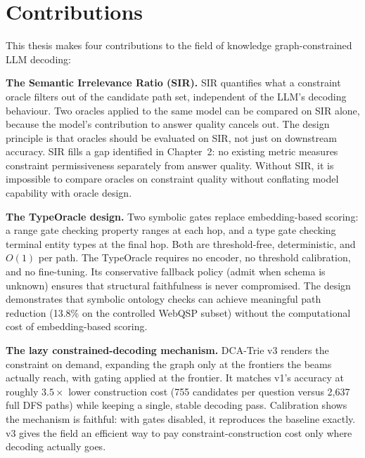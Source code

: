 \section{Contributions}
\label{sec:ch5contributions}

This thesis makes four contributions to the field of knowledge graph-constrained LLM decoding:

\textbf{The Semantic Irrelevance Ratio (SIR).} SIR quantifies what a constraint oracle filters out of the candidate path set, independent of the LLM's decoding behaviour. Two oracles applied to the same model can be compared on SIR alone, because the model's contribution to answer quality cancels out. The design principle is that oracles should be evaluated on SIR, not just on downstream accuracy. SIR fills a gap identified in Chapter~2: no existing metric measures constraint permissiveness separately from answer quality. Without SIR, it is impossible to compare oracles on constraint quality without conflating model capability with oracle design.

\textbf{The TypeOracle design.} Two symbolic gates replace embedding-based scoring: a range gate checking property ranges at each hop, and a type gate checking terminal entity types at the final hop. Both are threshold-free, deterministic, and $O(1)$ per path. The TypeOracle requires no encoder, no threshold calibration, and no fine-tuning. Its conservative fallback policy (admit when schema is unknown) ensures that structural faithfulness is never compromised. The design demonstrates that symbolic ontology checks can achieve meaningful path reduction (13.8\% on the controlled WebQSP subset) without the computational cost of embedding-based scoring.

\textbf{The lazy constrained-decoding mechanism.} DCA-Trie v3 renders the constraint on demand, expanding the graph only at the frontiers the beams actually reach, with gating applied at the frontier. It matches v1's accuracy at roughly $3.5\times$ lower construction cost (755 candidates per question versus 2,637 full DFS paths) while keeping a single, stable decoding pass. Calibration shows the mechanism is faithful: with gates disabled, it reproduces the baseline exactly. v3 gives the field an efficient way to pay constraint-construction cost only where decoding actually goes.

